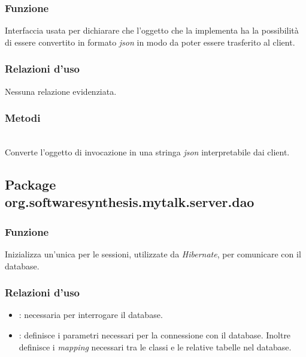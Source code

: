 
\subsubsection*{Funzione}
Interfaccia usata per dichiarare che l'oggetto che la implementa ha la possibilità di essere convertito in formato \textit{json} in modo da poter essere trasferito al client.

\subsubsection*{Relazioni d'uso}

Nessuna relazione evidenziata.

\subsubsection*{Metodi}

\begin{description}
	\item{}\\
	Converte l'oggetto di invocazione in una stringa \textit{json} interpretabile dai client.
\end{description}

\subsection{Package org.softwaresynthesis.mytalk.server.dao}\label{sec:dao}


\subsubsection*{Funzione}
Inizializza un'unica  per le sessioni, utilizzate da \textit{Hibernate}, per comunicare con il database.

\subsubsection*{Relazioni d'uso}

\begin{itemize}
	\item {}: necessaria per interrogare il database.
	\item {}: definisce i parametri necessari per la connessione con il database. Inoltre definisce i \textit{mapping} necessari tra le classi  e le relative tabelle nel database.
\end{itemize}

